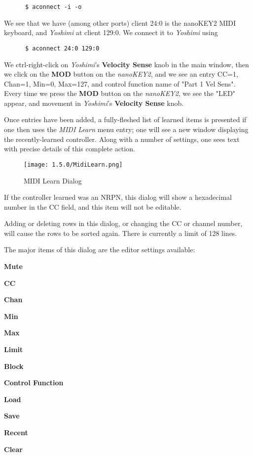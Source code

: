    \begin{verbatim}
      $ aconnect -i -o
   \end{verbatim}
   
   We see that we have (among other ports) client 24:0 is the nanoKEY2 MIDI
   keyboard, and \textsl{Yoshimi} at client 129:0.
   We connect it to \textsl{Yoshimi} using

   \begin{verbatim}
      $ aconnect 24:0 129:0
   \end{verbatim}

   We ctrl-right-click on \textsl{Yoshimi}'s \textbf{Velocity Sense} knob in
   the main window, then we click on the \textbf{MOD} button on the
   \textsl{nanoKEY2}, and we see an entry CC=1, Chan=1, Min=0, Max=127, and
   control function name of "Part 1 Vel Sens".  Every time we press the
   \textbf{MOD} button on the \textsl{nanoKEY2}, we see the "LED" appear, and
   movement in \textsl{Yoshimi}'s \textbf{Velocity Sense} knob.

   Once entries have been added, a fully-fleshed list of learned items is
   presented if one then uses the \textsl{MIDI Learn} menu entry; one will
   see a new window displaying the recently-learned controller. Along with a
   number of settings, one sees text with precise details of this complete
   action.

\begin{figure}[H]
   \centering 
   \texttt{[image: 1.5.0/MidiLearn.png]}
   \caption{MIDI Learn Dialog}
   \label{fig:midi_learn_dialog}
\end{figure}

   If the controller learned was an NRPN, this dialog will show a hexadecimal
   number in the CC field, and this item will not be editable.

   Adding or deleting rows in this dialog, or changing the CC or channel
   number, will cause the rows to be sorted again.
   There is currently a limit of 128 lines.

   The major items of this dialog are the editor settings available:

   \begin{enumber}
      \item \textbf{Mute}
      \item \textbf{CC}
      \item \textbf{Chan}
      \item \textbf{Min}
      \item \textbf{Max}
      \item \textbf{Limit}
      \item \textbf{Block}
      \item \textbf{Control Function}
      \item \textbf{Load}
      \item \textbf{Save}
      \item \textbf{Recent}
      \item \textbf{Clear}
   \end{enumber}

